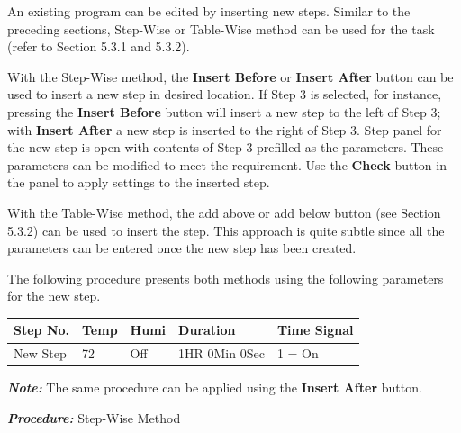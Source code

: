 An existing program can be edited by inserting new steps. Similar to the
preceding sections, Step-Wise or Table-Wise method can be used for the
task (refer to Section 5.3.1 and 5.3.2).

With the Step-Wise method, the \textbf{Insert Before} or \textbf{Insert
After} button can be used to insert a new step in desired location. If
Step 3 is selected, for instance, pressing the \textbf{Insert Before}
button will insert a new step to the left of Step 3; with \textbf{Insert
After} a new step is inserted to the right of Step 3. Step panel for the
new step is open with contents of Step 3 prefilled as the parameters.
These parameters can be modified to meet the requirement. Use the
\textbf{Check} button in the panel to apply settings to the inserted
step.

With the Table-Wise method, the add above or add below button (see
Section 5.3.2) can be used to insert the step. This approach is quite
subtle since all the parameters can be entered once the new step has
been created.

The following procedure presents both methods using the following
parameters for the new step.

\begin{longtable}[]{@{}lllll@{}}
\toprule
Step No. & Temp & Humi & Duration & Time Signal\tabularnewline
\midrule
\endhead
New Step & 72 & Off & 1HR 0Min 0Sec & 1 = On\tabularnewline
\bottomrule
\end{longtable}

\textbf{\emph{Note:}} The same procedure can be applied using the
\textbf{Insert After} button.

\textbf{\emph{Procedure:}} Step-Wise Method

